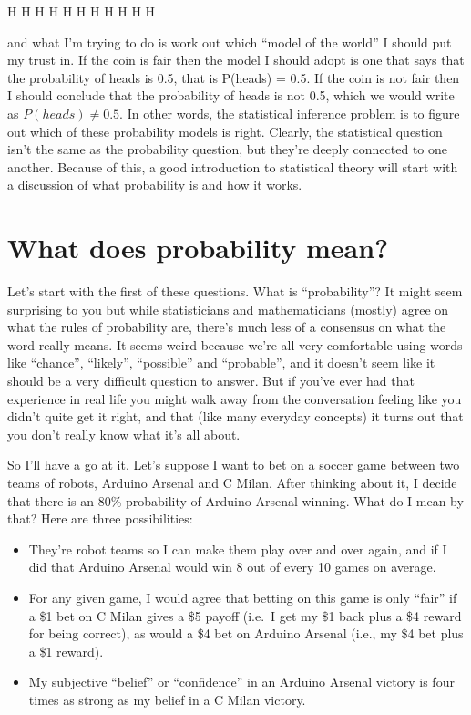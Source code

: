 \documentclass[
  letterpaper,
]{book}
\providecommand{\tightlist}{%
  \setlength{\itemsep}{0pt}\setlength{\parskip}{0pt}}\usepackage{longtable,booktabs,array}
\begin{document}
H H H H H H H H H H H

and what I'm trying to do is work out which ``model of the world'' I
should put my trust in. If the coin is fair then the model I should
adopt is one that says that the probability of heads is 0.5, that is
P(heads) = 0.5. If the coin is not fair then I should conclude that the
probability of heads is not 0.5, which we would write as
\(P(heads)\ne{0.5}\). In other words, the statistical inference problem
is to figure out which of these probability models is right. Clearly,
the statistical question isn't the same as the probability question, but
they're deeply connected to one another. Because of this, a good
introduction to statistical theory will start with a discussion of what
probability is and how it works.

\hypertarget{what-does-probability-mean}{%
\section{What does probability mean?}\label{what-does-probability-mean}}

Let's start with the first of these questions. What is ``probability''?
It might seem surprising to you but while statisticians and
mathematicians (mostly) agree on what the rules of probability are,
there's much less of a consensus on what the word really means. It seems
weird because we're all very comfortable using words like ``chance'',
``likely'', ``possible'' and ``probable'', and it doesn't seem like it
should be a very difficult question to answer. But if you've ever had
that experience in real life you might walk away from the conversation
feeling like you didn't quite get it right, and that (like many everyday
concepts) it turns out that you don't really know what it's all about.

So I'll have a go at it. Let's suppose I want to bet on a soccer game
between two teams of robots, Arduino Arsenal and C Milan. After thinking
about it, I decide that there is an 80\% probability of Arduino Arsenal
winning. What do I mean by that? Here are three possibilities:

\begin{itemize}
\tightlist
\item
  They're robot teams so I can make them play over and over again, and
  if I did that Arduino Arsenal would win 8 out of every 10 games on
  average.
\item
  For any given game, I would agree that betting on this game is only
  ``fair'' if a \$1 bet on C Milan gives a \$5 payoff (i.e.~I get my \$1
  back plus a \$4 reward for being correct), as would a \$4 bet on
  Arduino Arsenal (i.e., my \$4 bet plus a \$1 reward).
\item
  My subjective ``belief'' or ``confidence'' in an Arduino Arsenal
  victory is four times as strong as my belief in a C Milan victory.
\end{itemize}
\end{document}
